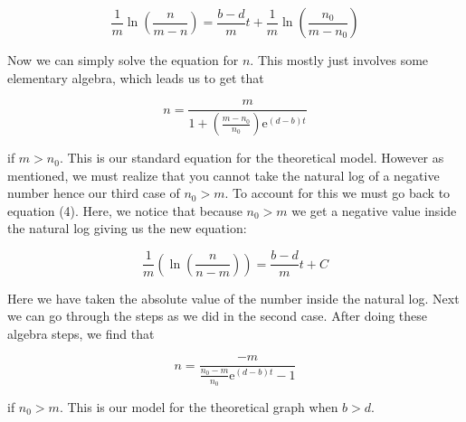 \documentclass[titlepage]{article}\usepackage[]{graphicx}\usepackage[]{color}
\begin{document}
\begin{equation}
\frac{1}{m} \ln\left(\frac{n}{m-n}\right) = \frac{b-d}{m}t + \frac{1}{m}\ln\left(\frac{n_0}{m-n_0}\right)
\end{equation}

\noindent Now we can simply solve the equation for \(n\). This mostly just involves some elementary algebra, which leads us to get that 

\begin{equation}
n = \frac{m}{1+\left(\frac{m-n_0}{n_0}\right)\mathrm{e}^{(d-b)t}}
\end{equation}

\noindent if \(m > n_0\). This is our standard equation for the theoretical model. However as mentioned, we must realize that you cannot take the natural log of a negative number hence our third case of \(n_0 >m\). To account for this we must go back to equation (4). Here, we notice that because \(n_0 > m\) we get a negative value inside the natural log giving us the new equation:

\begin{equation}
\frac{1}{m}\left(\ln\left(\frac{n}{n-m}\right)\right) = \frac{b-d}{m} t + C
\end{equation}

\noindent Here we have taken the absolute value of the number inside the natural log. Next we can go through the steps as we did in the second case. After doing these algebra steps, we find that 

\begin{equation}
n= \frac{-m}{\frac{n_0-m}{n_0}\mathrm{e}^{(d-b)t}-1}
\end{equation}

\noindent if \(n_0 > m\). This is our model for the theoretical graph when \(b > d\).
\bigskip
\end{document}

